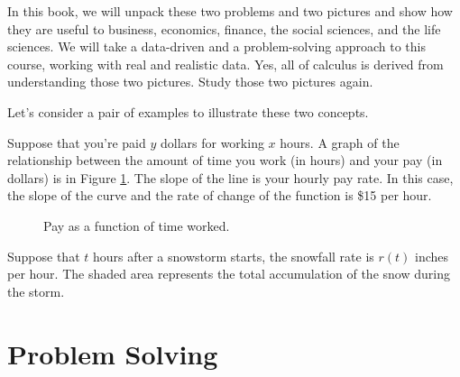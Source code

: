 In this book, we will unpack these two problems and two pictures and show how they are useful to business, economics, finance, the social sciences, and the life sciences. We will take a data-driven and a problem-solving approach to this course, working with real and realistic data. Yes, all of calculus is derived from understanding those two pictures. Study those two pictures again.

Let's consider a pair of examples to illustrate these two concepts.

\begin{example}
Suppose that you're paid $y$ dollars for working $x$ hours. A graph of the relationship between the amount of time you work (in hours) and your pay (in dollars) is in Figure \ref{fig:0-rate}. The slope of the line is your hourly pay rate. In this case, the slope of the curve and the rate of change of the function is \$15 per hour.
\begin{figure}[h!]
\centering
{}
\caption{Pay as a function of time worked.}
\label{fig:0-rate}
\end{figure}
\end{example}

\begin{example}
Suppose that $t$ hours after a snowstorm starts, the snowfall rate is $r(t)$ inches per hour. The shaded area represents the total accumulation of the snow during the storm.
\end{example}

\section{Problem Solving}
\label{sec:polya}

